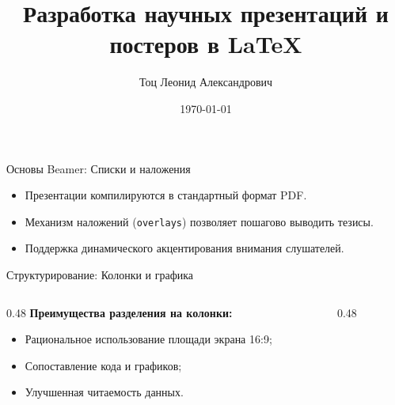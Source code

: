 \documentclass[aspectratio=169]{beamer}
\title[Инструменты визуализации]{Разработка научных презентаций и постеров в LaTeX}
\author[Тоц Л. А.]{Тоц Леонид Александрович}
\institute[ИВТ-2]{Группа ИВТ-2}
\date{\today}
\begin{document}
\begin{frame}[plain]
    \titlepage
\end{frame}

\begin{frame}{Основы Beamer: Списки и наложения}
    \begin{itemize}
        \item<1-> Презентации компилируются в стандартный формат PDF.
        \item<2-> Механизм наложений (\texttt{overlays}) позволяет пошагово выводить тезисы.
        \item<3-> Поддержка динамического акцентирования внимания слушателей.
    \end{itemize}
\end{frame}

\begin{frame}{Структурирование: Колонки и графика}
    \begin{columns}[c]
        \begin{column}{0.48\textwidth}
            \textbf{Преимущества разделения на колонки:}
            \begin{itemize}
                \item Рациональное использование площади экрана 16:9;
                \item Сопоставление кода и графиков;
                \item Улучшенная читаемость данных.
            \end{itemize}
        \end{column}
        \begin{column}{0.48\textwidth}
            \begin{center}
            \end{center}
        \end{column}
    \end{columns}
\end{frame}
\end{document}
